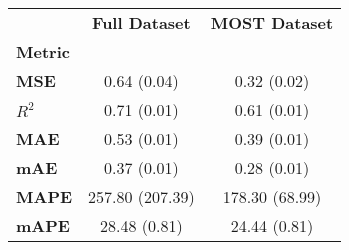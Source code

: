 \centering\begin{tabular}{l|cc}
\toprule
{} & \textbf{Full Dataset} & \textbf{MOST Dataset} \\
\textbf{Metric} &                       &                       \\
\midrule
\textbf{MSE   } &  0.64 (0.04) &  0.32 (0.02) \\
\textbf{$R^2$ } &  0.71 (0.01) &  0.61 (0.01) \\
\textbf{MAE   } &  0.53 (0.01) &  0.39 (0.01) \\
\textbf{mAE   } &  0.37 (0.01) &  0.28 (0.01) \\
\textbf{MAPE  } &  257.80 (207.39) &  178.30 (68.99) \\
\textbf{mAPE  } &  28.48 (0.81) &  24.44 (0.81) \\
\bottomrule
\end{tabular}
